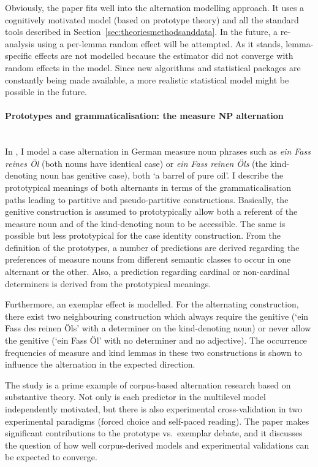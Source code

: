 Obviously, the paper fits well into the alternation modelling approach.
It uses a cognitively motivated model (based on prototype theory) and all the standard tools described in Section~\ref{sec:theoriesmethodsanddata}.
In the future, a re-analysis using a per-lemma random effect will be attempted.
As it stands, lemma-specific effects are not modelled because the estimator did not converge with random effects in the model.
Since new algorithms and statistical packages are constantly being made available, a more realistic statistical model might be possible in the future.

\paragraph[Prototypes and grammaticalisation]{Prototypes and grammaticalisation: the measure NP alternation}
\mbox{}\\[0.5\baselineskip]\noindent
In \ROMeasure, I model a case alternation in German measure noun phrases such as \textit{ein Fass reines Öl} (both nouns have identical case) or \textit{ein Fass reinen Öls} (the kind-denoting noun has genitive case), both `a barrel of pure oil'.
I describe the prototypical meanings of both alternants in terms of the grammaticalisation paths leading to partitive and pseudo-partitive \citep{Koptjevskaja2001} constructions.
Basically, the genitive construction is assumed to prototypically allow both a referent of the measure noun and of the kind-denoting noun to be accessible.
The same is possible but less prototypical for the case identity construction.
From the definition of the prototypes, a number of predictions are derived regarding the preferences of measure nouns from different semantic classes to occur in one alternant or the other.
Also, a prediction regarding cardinal or non-cardinal determiners is derived from the prototypical meanings.

Furthermore, an exemplar effect is modelled.
For the alternating construction, there exist two neighbouring construction which always require the genitive (`ein Fass des reinen Öls' with a determiner on the kind-denoting noun) or never allow the genitive (`ein Fass Öl' with no determiner and no adjective).
The occurrence frequencies of measure and kind lemmas in these two constructions is shown to influence the alternation in the expected direction.

The study is a prime example of corpus-based alternation research based on substantive theory.
Not only is each predictor in the multilevel model independently motivated, but there is also experimental cross-validation in two experimental paradigms (forced choice and self-paced reading).
The paper makes significant contributions to the prototype vs.\ exemplar debate, and it discusses the question of how well corpus-derived models and experimental validations can be expected to converge.

